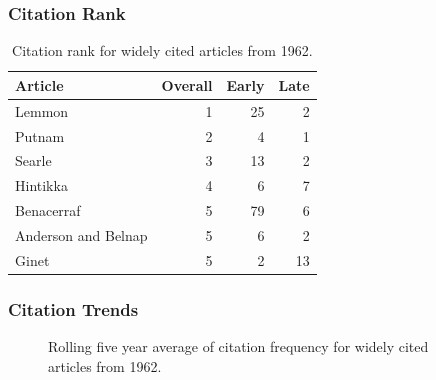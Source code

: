 \documentclass[
  10pt,
  letterpaper,
  DIV=11,
  numbers=noendperiod,
  twoside]{scrartcl}
\begin{document}
\subsubsection*{Citation Rank}\label{sec-rank-1962}

\begin{longtable}[]{@{}lrrr@{}}

\caption{\label{tbl-citation-rank-1962}Citation rank for widely cited
articles from 1962.}

\tabularnewline

\toprule\noalign{}
Article & Overall & Early & Late \\
\midrule\noalign{}
\endhead
\bottomrule\noalign{}
\endlastfoot
Lemmon & 1 & 25 & 2 \\
Putnam & 2 & 4 & 1 \\
Searle & 3 & 13 & 2 \\
Hintikka & 4 & 6 & 7 \\
Benacerraf & 5 & 79 & 6 \\
Anderson and Belnap & 5 & 6 & 2 \\
Ginet & 5 & 2 & 13 \\

\end{longtable}

\subsubsection*{Citation Trends}\label{sec-trends-1962}

\begin{figure}


\caption{\label{fig-citation-spaghetti-1962}Rolling five year average of
citation frequency for widely cited articles from 1962.}

\end{figure}%
\end{document}
